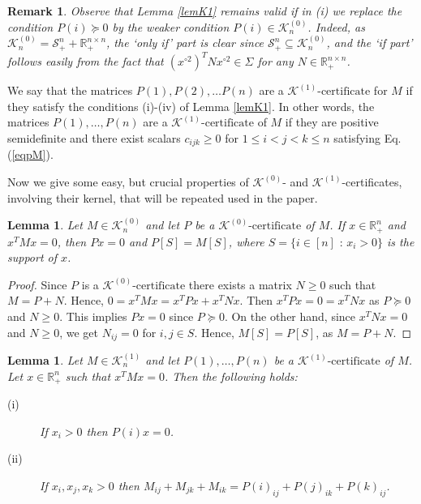 \documentclass[11pt]{article}
\newcommand{\oR}{{\mathbb R}}
\newtheorem{lemma}[theorem]{Lemma}
\newtheorem{remark}[theorem]{Remark}
\newcommand{\kzeroc}{\MK^{(0)}\text{-certificate}}
\newcommand{\konec}{\MK^{(1)}\text{-certificate}}
\numberwithin{equation}{section}
\newcommand{\MK}{{\mathcal K}}
\begin{document}
 \begin{remark}\label{remK0}
 Observe that Lemma \ref{lemK1} remains valid if in (i) we replace the condition $P(i)\succeq 0$ by the weaker condition $P(i)\in \mathcal K^{(0)}_n$. 
Indeed, as  $\MK_n^{(0)}=\mathcal {S}^n_+ +\oR^{n\times n}_+$, the `only if' part is clear  since $\mathcal{S}^n_+\subseteq \MK_n^{(0)}$, 
 and the `if part' follows easily from the fact that  $(x^{\circ 2})^TNx^{\circ 2}\in \Sigma$ for any $N\in\oR^{n\times n}_+$.
 \end{remark}
 
 We say that the matrices $P(1), P(2),\dots P(n)$ are a {\em $\konec$}  for $M$ if they satisfy the conditions (i)-(iv) of Lemma \ref{lemK1}.  In other words, the matrices $P(1), \dots, P(n)$ are a $\konec$ of $M$ if they are positive semidefinite 
 and there exist scalars $c_{ijk}\geq 0$ for $1\leq i < j < k\leq n$ satisfying Eq. (\ref{eqpM}).

Now we give some %
easy, but crucial properties of $\MK^{(0)}$- and $\MK^{(1)}$-certificates, involving their kernel, that will be repeated used in the paper.

\begin{lemma}\label{kernel-k0}
Let $M\in \MK_n^{(0)}$ and let $P$ be a $\kzeroc$ of $M$. If $x\in \mathbb{R}^n_+$ and $x^TMx=0$, then $Px=0$ and $P[S]=M[S]$, where $S=\{i\in[n] \text{ : } x_i>0\}$ is the support of $x$.
\end{lemma}
\begin{proof}
Since $P$ is a $\kzeroc$  there exists a matrix $N\geq 0$ such that $M=P+N$. Hence, $0=x^TMx=x^TPx +x^TNx$. Then  $x^TPx=0=x^TNx$ as $P\succeq 0$ and $N\geq 0$. This implies $Px=0$ since $P\succeq 0$. On the other hand, since $x^TNx=0$ and $N\geq 0$, we get $N_{ij}=0$ for $i,j\in S$. Hence, $M[S]=P[S]$, as $M=P+N$. 
\end{proof}

\begin{lemma}\label{kernel-k1}
Let $M\in\MK_n^{(1)}$ and let $P(1), \dots, P(n)$ be a $\konec$ of $M$. Let $x\in \mathbb{R}^{n}_+$ such that $x^TMx=0$. Then the following holds:
\begin{description}
\item[(i)] If $x_i>0$ then $P(i)x=0$.
\item[(ii)] If $x_i,x_j,x_k>0$ then $M_{ij}+M_{jk}+M_{ik}=P(i)_{ij}+P(j)_{ik} +P(k)_{ij}$.
\end{description}
\end{lemma}
\end{document}

